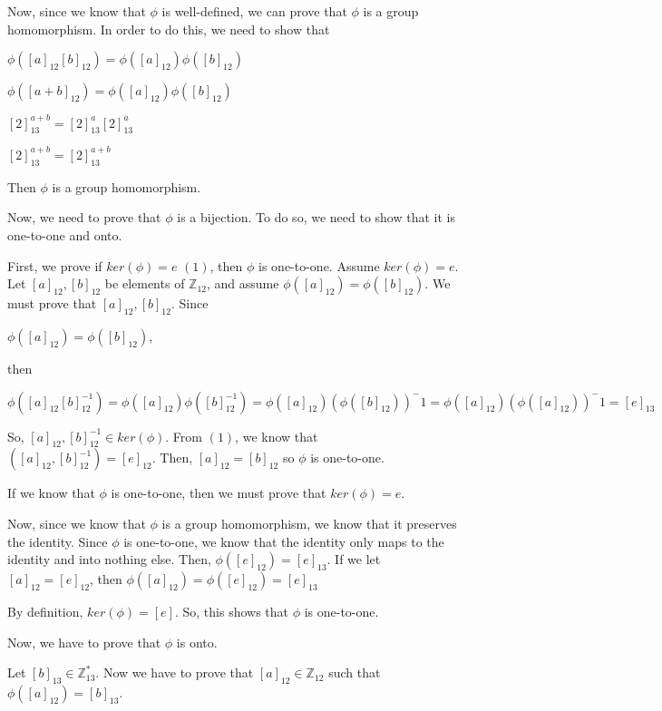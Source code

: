 \documentclass[11pt]{article}
\newcommand{\Z}{\mathbb{Z}}
\begin{document}
\begin{enumerate}
Now, since we know that $\phi$ is well-defined, we can prove that $\phi$ is a group homomorphism. In order to do this, we need to show that 
\begin{center}
$\phi([a]_{12}[b]_{12})=\phi([a]_{12})\phi([b]_{12}) $
\end{center}
\begin{center}
$\phi([a+b]_{12})=\phi([a]_{12})\phi([b]_{12}) $
\end{center}
\begin{center}
$[2]^{a+b}_{13}=[2]^{a}_{13} [2]^{a}_{13}$
\end{center}
\begin{center}
$[2]^{a+b}_{13}=[2]^{a+b}_{13}$
\end{center}

Then $\phi$ is a group homomorphism. 

Now, we need to prove that $\phi$ is a bijection. To do so, we need to show that it is one-to-one and onto. 

First, we prove if $ker(\phi)={e}$ $(1)$, then $\phi$ is one-to-one. Assume $ker(\phi)={e}$. Let $[a]_{12},[b]_{12}$ be elements of $\Z_{12}$, and assume $\phi([a]_{12})=\phi([b]_{12})$. We must prove that $[a]_{12},[b]_{12}$. Since 
\begin{center}
$\phi([a]_{12})=\phi([b]_{12})$, 
\end{center}
then
\begin{center}
$\phi([a]_{12}[b]^{-1}_{12})=\phi([a]_{12})\phi([b]^{-1}_{12})=\phi([a]_{12})(\phi([b]_{12}))^-1=\phi([a]_{12})(\phi([a]_{12}))^-1=[e]_{13}$
\end{center}
So, $[a]_{12},[b]^{-1}_{12}\in ker(\phi)$. From $(1)$, we know that $([a]_{12},[b]^{-1}_{12})=[e]_{12}$. Then, $[a]_{12}=[b]_{12}$ so $\phi$ is one-to-one. 

If we know that $\phi$ is one-to-one, then we must prove that $ker(\phi)={e}$. 

Now, since we know that $\phi$ is a group homomorphism, we know that it preserves the identity. Since $\phi$ is one-to-one, we know that the identity only maps to the identity and into nothing else. Then, $\phi([e]_{12})=[e]_{13}$. If we let $[a]_{12}=[e]_{12}$, then $\phi([a]_{12})=\phi([e]_{12})=[e]_{13}$

By definition, $ker(\phi)=[e]$. So, this shows that $\phi$ is one-to-one.

Now, we have to prove that $\phi$ is onto. 

Let $[b]_{13}\in \Z_{13}^*$. Now we have to prove that $[a]_{12}\in \Z_{12}$ such that $\phi([a]_{12})=[b]_{13}$.


\end{enumerate}
\end{document}
